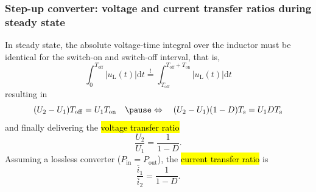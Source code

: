 \begin{frame}[fragile]
\begin{figure}
	\end{figure}
\end{frame}

\begin{frame}
	\frametitle{Step-up converter: voltage and current transfer ratios during steady state}
	In steady state, the absolute voltage-time integral over the inductor must be identical for the switch-on and switch-off interval, that is,
	\begin{equation}
		\int_{0}^{T_\mathrm{off}} \left|u_\mathrm{L}(t)\right| \mathrm{d}t \stackrel{!}{=} \int_{T_\mathrm{off}}^{T_\mathrm{off}+T_\mathrm{on}} \left|u_\mathrm{L}(t)\right| \mathrm{d}t
	\end{equation}\pause
	resulting in
	\begin{equation}
		(U_2-U_1)T_\mathrm{off} = U_1T_\mathrm{on} \quad \pause  \Leftrightarrow \quad  (U_2-U_1)(1-D)T_\mathrm{s} = U_1DT_\mathrm{s}
	\end{equation}\pause
	and finally delivering the \hl{voltage transfer ratio}
	\begin{equation}
		\frac{U_2}{U_1} = \frac{1}{1-D}.
	\end{equation}\pause
	Assuming a lossless converter ($P_\mathrm{in}=P_\mathrm{out}$), the \hl{current transfer ratio} is
	\begin{equation}
		\frac{\overline{i}_1}{\overline{i}_2} = \frac{1}{1-D}.
	\end{equation}
\end{frame}

